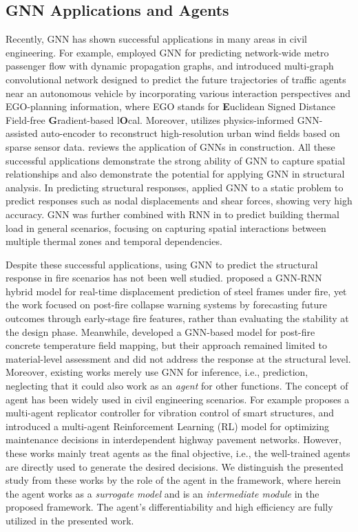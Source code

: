 {\blockRevise
\subsection{GNN Applications and Agents}
Recently, GNN has shown successful applications in many areas in civil engineering. For example, \cite{huang_dynamic_2024} employed GNN for predicting network-wide metro passenger flow with dynamic propagation graphs, and \cite{sheng_egoplanningguided_2024} introduced multi-graph convolutional network designed to predict the future trajectories of traffic agents near an autonomous vehicle by incorporating various interaction perspectives and EGO-planning information, where EGO stands for {\bf{E}}uclidean Signed Distance Field-free {\bf{G}}radient-based l{\bf{O}}cal. Moreover, \cite{gao_urban_2024} utilizes physics-informed GNN-assisted auto-encoder to reconstruct high-resolution urban wind fields based on sparse sensor data. \cite{jia_graph_2023a} reviews the application of GNNs in construction. All these successful applications demonstrate the strong ability of GNN to capture spatial relationships and also demonstrate the potential for applying GNN in structural analysis. In predicting structural responses, \cite{chou_structgnn_2024} applied GNN to a static problem to predict responses such as nodal displacements and shear forces, showing very high accuracy. GNN was further combined with RNN in \cite{jia_temporal_2024} to predict building thermal load in general scenarios, focusing on capturing spatial interactions between multiple thermal zones and temporal dependencies. 

Despite these successful applications, using GNN to predict the structural response in fire scenarios has not been well studied. \cite{wang_graph_2024} proposed a GNN-RNN hybrid model for real-time displacement prediction of steel frames under fire, yet the work focused on post-fire collapse warning systems by forecasting future outcomes through early-stage fire features, rather than evaluating the stability at the design phase. Meanwhile, \cite{chen_tempnet_2024} developed a GNN-based model for post-fire concrete temperature field mapping, but their approach remained limited to material-level assessment and did not address the response at the structural level. Moreover, existing works merely use GNN for inference, i.e., prediction, neglecting that it could also work as an \emph{agent} for other functions. The concept of agent has been widely used in civil engineering scenarios. For example \cite{soto_multiagent_2017} proposes a multi-agent replicator controller for vibration control of smart structures, and \cite{yao_multiagent_2024} introduced a multi-agent Reinforcement Learning (RL) model for optimizing maintenance decisions in interdependent highway pavement networks. However, these works mainly treat agents as the final objective, i.e., the well-trained agents are directly used to generate the desired decisions. We distinguish the presented study from these works by the role of the agent in the framework, where herein the agent works as a {\em{surrogate model}} and is an {\em{intermediate module}} in the proposed framework. The agent's differentiability and high efficiency are fully utilized in the presented work.

}
